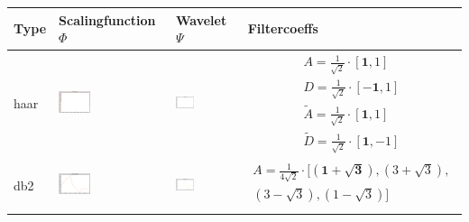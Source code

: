 \vspace{0.2cm}

\renewcommand{\arraystretch}{0.2}
\begin{tabular}{l||m{}|m{}|m{}}
	\textbf{Type} & \textbf{Scalingfunction} $\Phi$ & \textbf{Wavelet} $\Psi$ & \textbf{Filtercoeffs}\\
	\hline
	haar & 
	\includegraphics[width=0.3\textwidth]{content/HaarPhi.png} &
	\includegraphics[width=0.3\textwidth]{content/HaarPsi.png} & 
	\begin{align}
		A = \frac{1}{\sqrt{2}} \cdot [\mathbf{1}, 1] \nonumber\\ 
		D = \frac{1}{\sqrt{2}} \cdot [\mathbf{-1}, 1] \nonumber\\
		\tilde{A} = \frac{1}{\sqrt{2}} \cdot [\mathbf{1}, 1] \nonumber\\ 
		\tilde{D} = \frac{1}{\sqrt{2}} \cdot [\mathbf{1}, -1] \nonumber
	\end{align} \\
	\hline
	db2 &
	\includegraphics[width=0.3\textwidth]{content/Db2Phi.png} &
	\includegraphics[width=0.3\textwidth]{content/Db2Psi.png} & 
	\begin{align}
		A = \frac{1}{4\sqrt{2}} \cdot [\mathbf{(1+\sqrt{3})}, (3+\sqrt{3}),  \nonumber\\
		(3-\sqrt{3}), (1-\sqrt{3})] \nonumber\\

\end{align}
\end{tabular}
